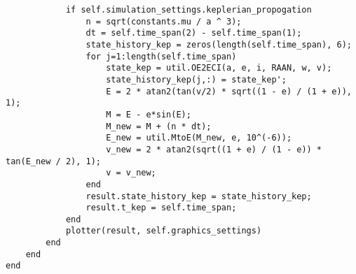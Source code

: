 \begin{lstlisting}
            if self.simulation_settings.keplerian_propogation
                n = sqrt(constants.mu / a ^ 3);
                dt = self.time_span(2) - self.time_span(1);
                state_history_kep = zeros(length(self.time_span), 6);
                for j=1:length(self.time_span)
                    state_kep = util.OE2ECI(a, e, i, RAAN, w, v);
                    state_history_kep(j,:) = state_kep';
                    E = 2 * atan2(tan(v/2) * sqrt((1 - e) / (1 + e)), 1);
                    M = E - e*sin(E);
                    M_new = M + (n * dt);
                    E_new = util.MtoE(M_new, e, 10^(-6));
                    v_new = 2 * atan2(sqrt((1 + e) / (1 - e)) * tan(E_new / 2), 1);
                    v = v_new;
                end
                result.state_history_kep = state_history_kep;
                result.t_kep = self.time_span;
            end
            plotter(result, self.graphics_settings)
        end
    end
end
\end{lstlisting}

